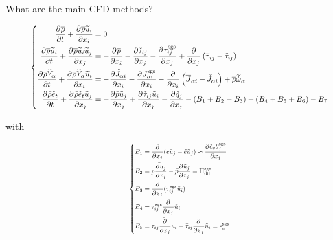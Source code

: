 \documentclass[10pt]{beamer}
\newcommand{\pd}[3][]{\frac{\partial^{#1}#2}{\partial{#3}^{#1}}}
\newcommand{\lrbkt}[1]{\left( #1 \right)}                         %
\begin{document}
\begin{frame}{What are the main CFD methods?}

\begin{equation}
\resizebox{0.91\hsize}{!}{
$
\left\{
\begin{aligned}
\pd{\overline{\rho}}{t}+\pd{\overline{\rho} \widetilde{u}_i}{x_i}&=0
\\
\pd{\overline{\rho} \widetilde{u}_i}{t}+
\pd{\overline{\rho}\widetilde{u}_i\widetilde{u}_j}{x_j}&=-\pd{\overline{p}}{x_i}+\pd{\check{\tau}_{ij}}{x_j}
-\pd{\tau_{ij}^{\mathrm{sgs}}}{x_j}
+\pd{}{x_j}\lrbkt{\overline\tau_{ij}-\check\tau_{ij}}
\\
\pd{\overline{\rho} \widetilde{Y}_\alpha}{t} 
+\pd{\overline{\rho} \widetilde{Y}_\alpha \widetilde{u}_i}{x_i}
&   = -\pd{\check J_{\alpha i}}{x_i}
- \pd{J_{\alpha i}^{\mathrm{sgs}}}{x_i} 
- \pd{}{x_i} \lrbkt{\overline J_{\alpha i}-\check J_{\alpha i}}
+ \overline{\rho}\widetilde{\dot\omega}_\alpha
\\
\pd{\bar\rho \check e_t}{t} 
+\pd{\bar{\rho} \check e_t \tilde{u}_j}{x_j}
& = - \pd{\bar{p}\tilde{u}_j}{x_j}
+ \pd{\check\tau_{ij}\tilde u_i}{x_j}
- \pd{\check{q}_j}{x_j}
- (B_1 + B_2 + B_3)
+ (B_4 + B_5 + B_6)
- B_7
\end{aligned}
\right.
$}
\end{equation}

with 
%

\begin{equation}
\resizebox{0.31\hsize}{!}{
$
\left\{
\begin{aligned}
   B_1 &= \pd{}{x_j}(\bar{eu_j}-\tilde e\tilde u_j) 
        \approx \pd{\tilde c_v\theta_j^{\mathrm{sgs}}}{x_j}
\\
   B_2 &= \bar{p\pd{u_j}{x_j}}-\bar p\pd{\tilde u_j}{x_j}=\Pi_{\mathrm{dil}}^{\mathrm{sgs}}\\
   B_3 &= \pd{}{x_j}(\tau_{ij}^{\mathrm{sgs}}\tilde u_i) \\
   B_4 &= \tau_{ij}^{\mathrm{sgs}}\pd{}{x_j}\tilde u_i \\
   B_5 &= \bar{\tau_{ij}\pd{}{x_j}u_i}-\bar\tau_{ij}\pd{}{x_j}\tilde u_i=\epsilon_v^{\mathrm{sgs}}
\end{aligned}
\right.
$}
\end{equation}

%


\end{frame}
\end{document}

